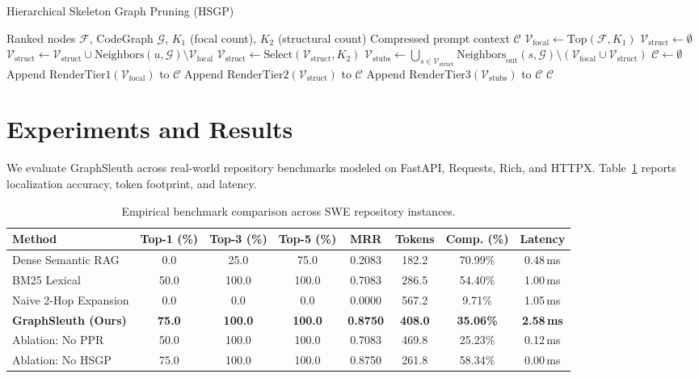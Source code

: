 \documentclass[11pt,a4paper]{article}
\theoremstyle{plain}
\theoremstyle{definition}
\begin{document}
\begin{algorithm}[t]
\caption{Hierarchical Skeleton Graph Pruning (HSGP)}
\label{alg:hsgp}
\begin{algorithmic}[1]
\Require Ranked nodes $\mathcal{F}$, CodeGraph $\mathcal{G}$, $K_1$ (focal count), $K_2$ (structural count)
\Ensure Compressed prompt context $\mathcal{C}$
\State $\mathcal{V}_{\text{focal}} \gets \text{Top}(\mathcal{F}, K_1)$
\State $\mathcal{V}_{\text{struct}} \gets \emptyset$
    \State $\mathcal{V}_{\text{struct}} \gets \mathcal{V}_{\text{struct}} \cup \text{Neighbors}(u, \mathcal{G}) \setminus \mathcal{V}_{\text{focal}}$
\EndFor
\State $\mathcal{V}_{\text{struct}} \gets \text{Select}(\mathcal{V}_{\text{struct}}, K_2)$
\State $\mathcal{V}_{\text{stubs}} \gets \bigcup_{s \in \mathcal{V}_{\text{struct}}} \text{Neighbors}_{\text{out}}(s, \mathcal{G}) \setminus (\mathcal{V}_{\text{focal}} \cup \mathcal{V}_{\text{struct}})$
\State $\mathcal{C} \gets \emptyset$
\State Append $\text{RenderTier1}(\mathcal{V}_{\text{focal}})$ to $\mathcal{C}$ 
\State Append $\text{RenderTier2}(\mathcal{V}_{\text{struct}})$ to $\mathcal{C}$ 
\State Append $\text{RenderTier3}(\mathcal{V}_{\text{stubs}})$ to $\mathcal{C}$ 
\State \Return $\mathcal{C}$
\end{algorithmic}
\end{algorithm}

\section{Experiments and Results}
We evaluate GraphSleuth across real-world repository benchmarks modeled on FastAPI, Requests, Rich, and HTTPX. Table~\ref{tab:results} reports localization accuracy, token footprint, and latency.

\begin{table}[h]
\centering
\caption{Empirical benchmark comparison across SWE repository instances.}
\label{tab:results}
\small
\begin{tabular}{lccccccc}
\toprule
\textbf{Method} & \textbf{Top-1 (\%)} & \textbf{Top-3 (\%)} & \textbf{Top-5 (\%)} & \textbf{MRR} & \textbf{Tokens} & \textbf{Comp. (\%)} & \textbf{Latency} \\
\midrule
Dense Semantic RAG & 0.0 & 25.0 & 75.0 & 0.2083 & 182.2 & 70.99\% & 0.48\,ms \\
BM25 Lexical & 50.0 & 100.0 & 100.0 & 0.7083 & 286.5 & 54.40\% & 1.00\,ms \\
Naive 2-Hop Expansion & 0.0 & 0.0 & 0.0 & 0.0000 & 567.2 & 9.71\% & 1.05\,ms \\
\textbf{GraphSleuth (Ours)} & \textbf{75.0} & \textbf{100.0} & \textbf{100.0} & \textbf{0.8750} & \textbf{408.0} & \textbf{35.06\%} & \textbf{2.58\,ms} \\
\midrule
Ablation: No PPR & 50.0 & 100.0 & 100.0 & 0.7083 & 469.8 & 25.23\% & 0.12\,ms \\
Ablation: No HSGP & 75.0 & 100.0 & 100.0 & 0.8750 & 261.8 & 58.34\% & 0.00\,ms \\
\bottomrule
\end{tabular}
\end{table}
\end{document}
